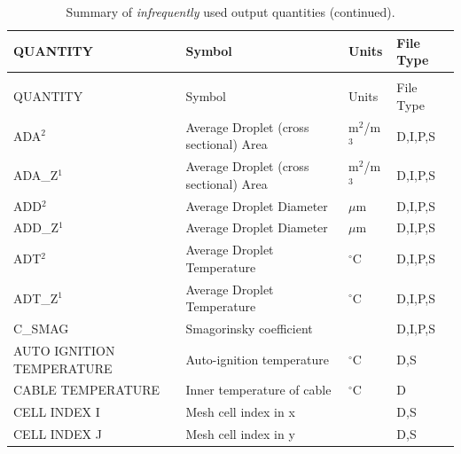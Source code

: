 \documentclass[11pt]{book}
\begin{document}
\begin{longtable}{@{\extracolsep{\fill}}|l|l|l|l|}
\caption[Infrequently used output quantities]{Summary of {\em infrequently} used output quantities.}
\label{tab:oddoutput} \\
\hline
{\ct QUANTITY}                           & Symbol                                        & Units          & File Type    \\
\hline \hline
\endfirsthead
\caption[]{Summary of {\em infrequently} used output quantities (continued).} \\
\hline
{\ct QUANTITY}                           & Symbol                                        & Units          & File Type    \\
\hline \hline
\endhead
{\ct ADA}$^2$                                   & Average Droplet (cross sectional) Area            & m$^2$/m$^3$    & D,I,P,S      \\ \hline
{\ct ADA\_Z}$^1$                                & Average Droplet (cross sectional) Area            & m$^2$/m$^3$    & D,I,P,S      \\ \hline
{\ct ADD}$^2$                                   & Average Droplet Diameter                          & $\mu$m         & D,I,P,S      \\ \hline
{\ct ADD\_Z}$^1$                                & Average Droplet Diameter                          & $\mu$m         & D,I,P,S      \\ \hline
{\ct ADT}$^2$                                   & Average Droplet Temperature                       & $^\circ$C      & D,I,P,S      \\ \hline
{\ct ADT\_Z}$^1$                                & Average Droplet Temperature                       & $^\circ$C      & D,I,P,S      \\ \hline
{\ct C\_SMAG}                                   & Smagorinsky coefficient                           &                & D,I,P,S      \\ \hline
{\ct AUTO IGNITION TEMPERATURE}                 & Auto-ignition temperature                         & $^\circ$C      & D,S          \\ \hline
{\ct CABLE TEMPERATURE}                         & Inner temperature of cable                        & $^\circ$C      & D            \\ \hline
{\ct CELL INDEX I}                              & Mesh cell index in x                              &                & D,S          \\ \hline
{\ct CELL INDEX J}                              & Mesh cell index in y                              &                & D,S          \\ \hline

\end{longtable}
\end{document}
